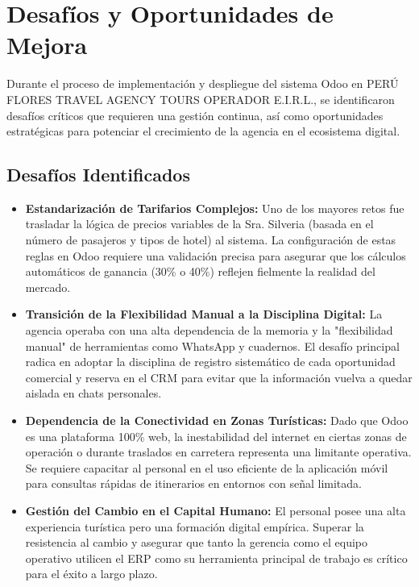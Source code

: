 \section{Desafíos y Oportunidades de Mejora}

Durante el proceso de implementación y despliegue del sistema Odoo en PERÚ FLORES TRAVEL AGENCY TOURS OPERADOR E.I.R.L., se identificaron desafíos críticos que requieren una gestión continua, así como oportunidades estratégicas para potenciar el crecimiento de la agencia en el ecosistema digital.

\subsection{Desafíos Identificados}

\begin{itemize}
    \item \textbf{Estandarización de Tarifarios Complejos:} Uno de los mayores retos fue trasladar la lógica de precios variables de la Sra. Silveria (basada en el número de pasajeros y tipos de hotel) al sistema. La configuración de estas reglas en Odoo requiere una validación precisa para asegurar que los cálculos automáticos de ganancia (30\% o 40\%) reflejen fielmente la realidad del mercado.
    \item \textbf{Transición de la Flexibilidad Manual a la Disciplina Digital:} La agencia operaba con una alta dependencia de la memoria y la "flexibilidad manual" de herramientas como WhatsApp y cuadernos. El desafío principal radica en adoptar la disciplina de registro sistemático de cada oportunidad comercial y reserva en el CRM para evitar que la información vuelva a quedar aislada en chats personales.
    \item \textbf{Dependencia de la Conectividad en Zonas Turísticas:} Dado que Odoo es una plataforma 100\% web, la inestabilidad del internet en ciertas zonas de operación o durante traslados en carretera representa una limitante operativa. Se requiere capacitar al personal en el uso eficiente de la aplicación móvil para consultas rápidas de itinerarios en entornos con señal limitada.
    \item \textbf{Gestión del Cambio en el Capital Humano:} El personal posee una alta experiencia turística pero una formación digital empírica. Superar la resistencia al cambio y asegurar que tanto la gerencia como el equipo operativo utilicen el ERP como su herramienta principal de trabajo es crítico para el éxito a largo plazo.
\end{itemize}

